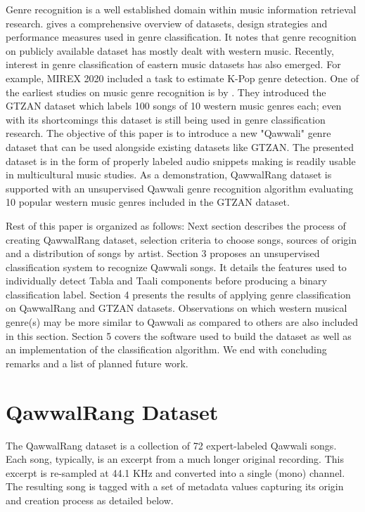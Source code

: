 \documentclass{article}
\begin{document}
Genre recognition is a well established domain within music information retrieval research. \cite{music_genre_survey} gives a comprehensive overview of datasets, design strategies and performance measures used in genre classification. It notes that genre recognition on publicly available dataset has mostly dealt with western music. Recently, interest in genre classification of eastern music datasets has also emerged. For example, MIREX 2020 \citep{mirex} included a task to estimate K-Pop genre detection. One of the earliest studies on music genre recognition is by \cite{gtzan}. They introduced the GTZAN dataset which labels 100 songs of 10 western music genres each; even with its shortcomings this dataset is still being used in genre classification research. The objective of this paper is to introduce a new "Qawwali" genre dataset that can be used alongside existing datasets like GTZAN. The presented dataset is in the form of properly labeled audio snippets making is readily usable in multicultural music studies. As a demonstration, QawwalRang dataset is supported with an unsupervised Qawwali genre recognition algorithm evaluating 10 popular western music genres included in the GTZAN dataset.

Rest of this paper is organized as follows: Next section describes the process of creating QawwalRang dataset, selection criteria to choose songs, sources of origin and a distribution of songs by artist. Section 3 proposes an unsupervised classification system to recognize Qawwali songs. It details the features used to individually detect Tabla and Taali components before producing a binary classification label. Section 4 presents the results of applying genre classification on QawwalRang and GTZAN datasets. Observations on which western musical genre(s) may be more similar to Qawwali as compared to others are also included in this section. Section 5 covers the software used to build the dataset as well as an implementation of the classification algorithm. We end with concluding remarks and a list of planned future work.

\section{QawwalRang Dataset}\label{sec:data}

The QawwalRang dataset is a collection of 72 expert-labeled Qawwali songs. Each song, typically, is an excerpt from a much longer original recording. This excerpt is re-sampled at 44.1 KHz and converted into a single (mono) channel. The resulting song is tagged with a set of metadata values capturing its origin and creation process as detailed below.
\end{document}
